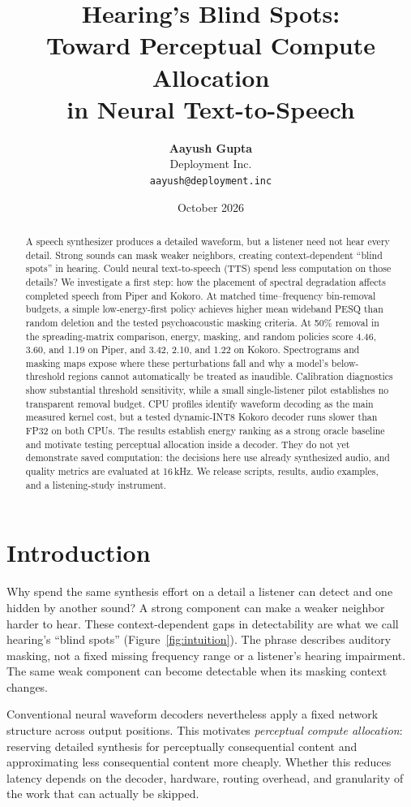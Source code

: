 \documentclass[11pt,a4paper]{article}
\title{\textbf{Hearing's Blind Spots:\\Toward Perceptual Compute Allocation\\in Neural Text-to-Speech}}
\author{\textbf{Aayush Gupta}\\Deployment Inc.\\{\footnotesize\texttt{aayush@deployment.inc}}}
\date{October 2026}
\begin{document}
\maketitle
\begin{abstract}
A speech synthesizer produces a detailed waveform, but a listener need not hear every detail. Strong sounds can mask weaker neighbors, creating context-dependent ``blind spots'' in hearing. Could neural text-to-speech (TTS) spend less computation on those details? We investigate a first step: how the placement of spectral degradation affects completed speech from Piper and Kokoro. At matched time--frequency bin-removal budgets, a simple low-energy-first policy achieves higher mean wideband PESQ than random deletion and the tested psychoacoustic masking criteria. At 50\% removal in the spreading-matrix comparison, energy, masking, and random policies score 4.46, 3.60, and 1.19 on Piper, and 3.42, 2.10, and 1.22 on Kokoro. Spectrograms and masking maps expose where these perturbations fall and why a model's below-threshold regions cannot automatically be treated as inaudible. Calibration diagnostics show substantial threshold sensitivity, while a small single-listener pilot establishes no transparent removal budget. CPU profiles identify waveform decoding as the main measured kernel cost, but a tested dynamic-INT8 Kokoro decoder runs slower than FP32 on both CPUs. The results establish energy ranking as a strong oracle baseline and motivate testing perceptual allocation inside a decoder. They do not yet demonstrate saved computation: the decisions here use already synthesized audio, and quality metrics are evaluated at 16\,kHz. We release scripts, results, audio examples, and a listening-study instrument.
\end{abstract}

\section{Introduction}
Why spend the same synthesis effort on a detail a listener can detect and one hidden by another sound? A strong component can make a weaker neighbor harder to hear. These context-dependent gaps in detectability are what we call hearing's ``blind spots'' (Figure~\ref{fig:intuition}). The phrase describes auditory masking, not a fixed missing frequency range or a listener's hearing impairment. The same weak component can become detectable when its masking context changes.

Conventional neural waveform decoders nevertheless apply a fixed network structure across output positions. This motivates \emph{perceptual compute allocation}: reserving detailed synthesis for perceptually consequential content and approximating less consequential content more cheaply. Whether this reduces latency depends on the decoder, hardware, routing overhead, and granularity of the work that can actually be skipped.
\end{document}
